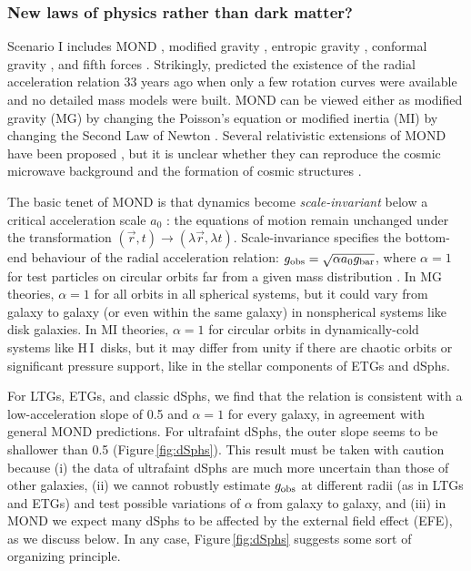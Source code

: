 \documentclass[apjl, twocolappendix]{emulateapj}
\newcommand{\hi } {{\rm H}\,{\small\rm I} \,}
\begin{document}
\subsubsection{New laws of physics rather than dark matter?}

Scenario I includes MOND \citep{Milgrom1983}, modified gravity \citep{Moffat2016}, entropic gravity \citep{Verlinde2016}, conformal gravity \citep{OBrien2012}, and fifth forces \citep{Burrage2016}. Strikingly, \citet{Milgrom1983} predicted the existence of the radial acceleration relation 33 years ago when only a few rotation curves were available \citep{Rubin1978, Bosma1978} and no detailed mass models were built. MOND can be viewed either as modified gravity (MG) by changing the Poisson's equation \citep{Bekenstein1984, Milgrom2010} or modified inertia (MI) by changing the Second Law of Newton \citep{Milgrom1994, Milgrom2006}. Several relativistic extensions of MOND have been proposed \citep[see][]{Famaey2012}, but it is unclear whether they can reproduce the cosmic microwave background and the formation of cosmic structures \citep{McGaugh2015b}.

The basic tenet of MOND is that dynamics become \textit{scale-invariant} below a critical acceleration scale $a_0$ \citep{Milgrom2009}: the equations of motion remain unchanged under the transformation $(\vec{r}, t) \rightarrow (\lambda \vec{r}, \lambda t)$. Scale-invariance specifies the bottom-end behaviour of the radial acceleration relation: $g_{\rm obs} = \sqrt{\alpha a_{0} g_{\rm bar}}$, where $\alpha=1$ for test particles on circular orbits far from a given mass distribution \citep{Milgrom2014}. In MG theories, $\alpha =1$ for all orbits in all spherical systems, but it could vary from galaxy to galaxy (or even within the same galaxy) in nonspherical systems like disk galaxies. In MI theories, $\alpha=1$ for circular orbits in dynamically-cold systems like \hi disks, but it may differ from unity if there are chaotic orbits or significant pressure support, like in the stellar components of ETGs and dSphs.

For LTGs, ETGs, and classic dSphs, we find that the relation is consistent with a low-acceleration slope of 0.5 and $\alpha=1$ for every galaxy, in agreement with general MOND predictions. For ultrafaint dSphs, the outer slope seems to be shallower than 0.5 (Figure\,\ref{fig:dSphs}). This result must be taken with caution because (i) the data of ultrafaint dSphs are much more uncertain than those of other galaxies, (ii) we cannot robustly estimate $g_{\rm obs}$ at different radii (as in LTGs and ETGs) and test possible variations of $\alpha$ from galaxy to galaxy, and (iii) in MOND we expect many dSphs to be affected by the external field effect (EFE), as we discuss below. In any case, Figure\,\ref{fig:dSphs} suggests some sort of organizing principle.
\end{document}
